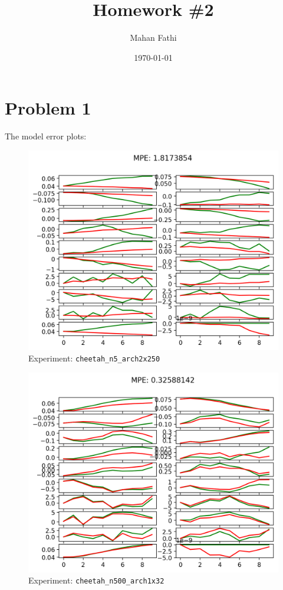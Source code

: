 \documentclass[11pt]{article}
\author{Mahan Fathi}
\date{\today}
\title{Homework \#2}
\begin{document}
\maketitle

\section{Problem 1}
\label{sec:org33e2dec}
The model error plots:

\begin{figure}[htbp]
\centering
\includegraphics[width=.9\linewidth]{./hw2_q1_cheetah_n5_arch2x250_cheetah-ift6163-v0_17-02-2022_21-24-04/itr_0_predictions.png}
\caption{Experiment: \texttt{cheetah\_n5\_arch2x250}}
\end{figure}

\begin{figure}[htbp]
\centering
\includegraphics[width=.9\linewidth]{./hw2_q1_cheetah_n500_arch1x32_cheetah-ift6163-v0_17-02-2022_21-23-37/itr_0_predictions.png}
\caption{Experiment: \texttt{cheetah\_n500\_arch1x32}}
\end{figure}
\end{document}
